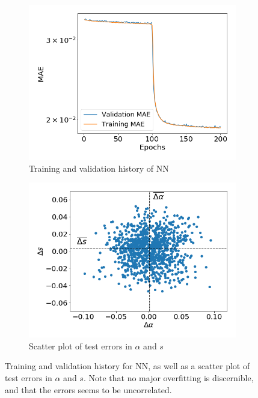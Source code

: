 \documentclass[11pt,a4paper]{article}
\begin{document}
\begin{figure}[H]
    \centering
    \begin{subfigure}{.46\textwidth}
          \centering
          \includegraphics[width=1\textwidth]{figures/NN_training.png}
          \caption{Training and validation history of NN} 
          \label{fig:NN_training}
    \end{subfigure}%
    \begin{subfigure}{.46\textwidth}
          \centering
          \includegraphics[width=1\textwidth]{figures/NN_error.png}
          \caption{Scatter plot of test errors in $\alpha$ and $s$}
    \label{fig:NN_errors}
    \end{subfigure}
    \caption{Training and validation history for NN, as well as a scatter plot of test errors in $\alpha$ and $s$. Note that no major overfitting is discernible, and that the errors seems to be uncorrelated.}
    \label{fig:NN}
\end{figure}
\end{document}
